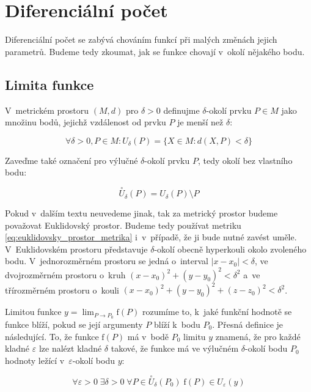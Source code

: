 \chapter{Diferenciální počet}

Diferenciální počet se zabývá chováním funkcí při malých změnách jejich parametrů. Budeme tedy zkoumat, jak se funkce chovají v~okolí nějakého bodu.

\section{Limita funkce}

V~metrickém prostoru \((M, d)\) pro \(\delta > 0\) definujme \(\delta\)-okolí prvku \(P \in M\) jako množinu bodů, jejichž vzdálenost od prvku \(P\) je menší než \(\delta\):

\begin{equation}
\forall \delta > 0, P \in M: U_{\delta}(P) = \{X \in M: d(X, P) < \delta\}
\end{equation}

Zaveďme také označení pro výlučné \(\delta\)-okolí prvku \(P\), tedy okolí bez vlastního bodu:

\begin{equation}
\overset{\circ}{U}_{\delta}(P) = U_{\delta}(P) \setminus P
\end{equation}

Pokud v~dalším textu neuvedeme jinak, tak za metrický prostor budeme považovat Euklidovský prostor. Budeme tedy používat metriku \eqref{eq:euklidovsky_prostor_metrika} i~v~případě, že ji bude nutné zavést uměle. V~Euklidovském prostoru představuje  \(\delta\)-okolí obecně hyperkouli okolo zvoleného bodu. V~jednorozměrném prostoru se jedná o~interval \(|x - x_0| < \delta\), ve dvojrozměrném prostoru o~kruh \((x - x_0)^2 + (y - y_0)^2 < \delta^2\) a~ve třírozměrném prostoru o~kouli \((x - x_0)^2 + (y - y_0)^2 + (z - z_0)^2 < \delta^2\).

Limitou funkce \(y = \lim_{P \to P_0} \mathrm{f}(P)\) rozumíme to, k~jaké funkční hodnotě se funkce blíží, pokud se její argumenty \(P\) blíží k~bodu \(P_0\). Přesná definice je následující. To, že funkce \(\mathrm{f}(P)\) má v~bodě \(P_0\) limitu \(y\) znamená, že pro každé kladné \(\varepsilon\) lze nalézt kladné \(\delta\) takové, že funkce má ve výlučném \(\delta\)-okolí bodu \(P_0\) hodnoty ležící v~\(\varepsilon\)-okolí bodu \(y\):

\begin{equation}
\forall \varepsilon > 0 \; \exists \delta > 0 \; \forall P \in \overset{\circ}{U}_{\delta}(P_0) \; \mathrm{f}(P) \in U_{\varepsilon}(y)
\end{equation}

